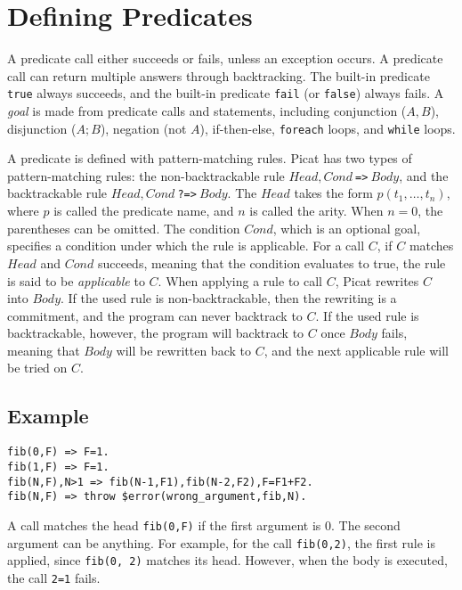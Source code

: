\section{Defining Predicates}
A predicate call either succeeds or fails, unless an exception occurs. A predicate call can return multiple answers through backtracking. The built-in predicate \texttt{true} always succeeds, and the built-in predicate \texttt{fail} (or \texttt{false}) always fails. A \emph{goal} is made from predicate calls and statements, including conjunction ($A,B$), disjunction ($A;B$), negation (not $A$), if-then-else, \texttt{foreach} loops, and \texttt{while} loops.

A predicate is defined with pattern-matching rules. Picat has two types of pattern-matching rules: the non-backtrackable rule $Head, Cond\ $\verb+=>+$\ Body$, and the backtrackable rule $Head, Cond\ $\verb+?=>+$\ Body$. The $Head$ takes the form $p(t_1,\ldots,t_n)$, where $p$ is called the predicate name, and $n$ is called the arity. When $n=0$, the parentheses can be omitted. The condition $Cond$, which is an optional goal, specifies a condition under which the rule is applicable. For a call $C$, if $C$ matches $Head$ and $Cond$ succeeds, meaning that the condition evaluates to true, the rule is said to be \emph{applicable} to $C$. When applying a rule to call $C$, Picat rewrites $C$ into $Body$. If the used rule is non-backtrackable, then the rewriting is a commitment, and the program can never backtrack to $C$. If the used rule is backtrackable, however, the program will backtrack to $C$ once $Body$ fails, meaning that $Body$ will be rewritten back to $C$, and the next applicable rule will be tried on $C$. 

\subsection*{Example}
\begin{verbatim}
fib(0,F) => F=1.
fib(1,F) => F=1.
fib(N,F),N>1 => fib(N-1,F1),fib(N-2,F2),F=F1+F2.
fib(N,F) => throw $error(wrong_argument,fib,N).
\end{verbatim}

A call matches the head \texttt{fib(0,F)} if the first argument is 0. The second argument can be anything. For example, for the call \texttt{fib(0,2)}, the first rule is applied, since \texttt{fib(0, 2)} matches its head. However, when the body is executed, the call \texttt{2=1} fails.  

